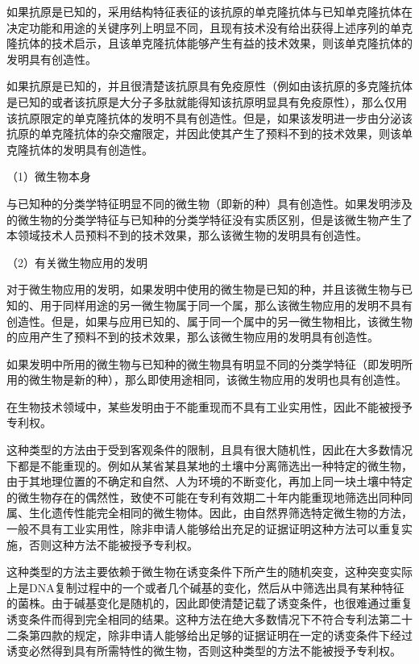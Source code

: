 如果抗原是已知的，采用结构特征表征的该抗原的单克隆抗体与已知单克隆抗体在决定功能和用途的关键序列上明显不同，且现有技术没有给出获得上述序列的单克隆抗体的技术启示，且该单克隆抗体能够产生有益的技术效果，则该单克隆抗体的发明具有创造性。

如果抗原是已知的，并且很清楚该抗原具有免疫原性（例如由该抗原的多克隆抗体是已知的或者该抗原是大分子多肽就能得知该抗原明显具有免疫原性），那么仅用该抗原限定的单克隆抗体的发明不具有创造性。但是，如果该发明进一步由分泌该抗原的单克隆抗体的杂交瘤限定，并因此使其产生了预料不到的技术效果，则该单克隆抗体的发明具有创造性。

{\setlength{\parindent}{17.1bp}（1）微生物本身\par}

与已知种的分类学特征明显不同的微生物（即新的种）具有创造性。如果发明涉及的微生物的分类学特征与已知种的分类学特征没有实质区别，但是该微生物产生了本领域技术人员预料不到的技术效果，那么该微生物的发明具有创造性。

{\setlength{\parindent}{17.1bp}（2）有关微生物应用的发明\par}

对于微生物应用的发明，如果发明中使用的微生物是已知的种，并且该微生物与已知的、用于同样用途的另一微生物属于同一个属，那么该微生物应用的发明不具有创造性。但是，如果与应用已知的、属于同一个属中的另一微生物相比，该微生物的应用产生了预料不到的技术效果，那么该微生物应用的发明具有创造性。

如果发明中所用的微生物与已知种的微生物具有明显不同的分类学特征（即发明所用的微生物是新的种），那么即使用途相同，该微生物应用的发明也具有创造性。

在生物技术领域中，某些发明由于不能重现而不具有工业实用性，因此不能被授予专利权。

这种类型的方法由于受到客观条件的限制，且具有很大随机性，因此在大多数情况下都是不能重现的。例如从某省某县某地的土壤中分离筛选出一种特定的微生物，由于其地理位置的不确定和自然、人为环境的不断变化，再加上同一块土壤中特定的微生物存在的偶然性，致使不可能在专利有效期二十年内能重现地筛选出同种同属、生化遗传性能完全相同的微生物体。因此，由自然界筛选特定微生物的方法，一般不具有工业实用性，除非申请人能够给出充足的证据证明这种方法可以重复实施，否则这种方法不能被授予专利权。

这种类型的方法主要依赖于微生物在诱变条件下所产生的随机突变，这种突变实际上是DNA复制过程中的一个或者几个碱基的变化，然后从中筛选出具有某种特征的菌株。由于碱基变化是随机的，因此即使清楚记载了诱变条件，也很难通过重复诱变条件而得到完全相同的结果。这种方法在绝大多数情况下不符合专利法第二十二条第四款的规定，除非申请人能够给出足够的证据证明在一定的诱变条件下经过诱变必然得到具有所需特性的微生物，否则这种类型的方法不能被授予专利权。

